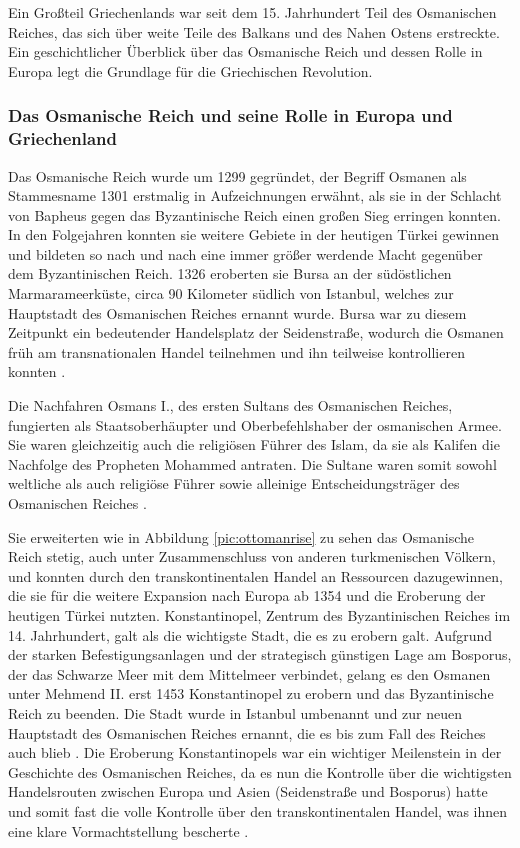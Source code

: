 \documentclass[preprint]{geomorphica} %
\begin{document}
Ein Großteil Griechenlands war seit dem 15. Jahrhundert Teil des Osmanischen Reiches, das sich über weite Teile des Balkans und des Nahen Ostens erstreckte.
Ein geschichtlicher Überblick über das Osmanische Reich und dessen Rolle in Europa legt die Grundlage für die Griechischen Revolution.

\subsubsection{Das Osmanische Reich und seine Rolle in Europa und Griechenland}

Das Osmanische Reich wurde um 1299 gegründet, der Begriff Osmanen als Stammesname 1301 erstmalig in Aufzeichnungen erwähnt, als sie in der Schlacht von Bapheus gegen das Byzantinische Reich einen großen Sieg erringen konnten.
In den Folgejahren konnten sie weitere Gebiete in der heutigen Türkei gewinnen und bildeten so nach und nach eine immer größer werdende Macht gegenüber dem Byzantinischen Reich.
1326 eroberten sie Bursa an der südöstlichen Marmarameerküste, circa 90 Kilometer südlich von Istanbul, welches zur Hauptstadt des Osmanischen Reiches ernannt wurde.
Bursa war zu diesem Zeitpunkt ein bedeutender Handelsplatz der Seidenstraße, wodurch die Osmanen früh am transnationalen Handel teilnehmen und ihn teilweise kontrollieren konnten \cite{Finkel2007, Inalcik1991, Kinross1979}.

Die Nachfahren Osmans I., des ersten Sultans des Osmanischen Reiches, fungierten als Staatsoberhäupter und Oberbefehlshaber der osmanischen Armee.
Sie waren gleichzeitig auch die religiösen Führer des Islam, da sie als Kalifen die Nachfolge des Propheten Mohammed antraten.
Die Sultane waren somit sowohl weltliche als auch religiöse Führer sowie alleinige Entscheidungsträger des Osmanischen Reiches \cite{Finkel2007, Kafadar1995, Lowry2003}.

Sie erweiterten wie in Abbildung \ref{pic:ottomanrise} zu sehen das Osmanische Reich stetig, auch unter Zusammenschluss von anderen turkmenischen Völkern, und konnten durch den transkontinentalen Handel an Ressourcen dazugewinnen, die sie für die weitere Expansion nach Europa ab 1354 und die Eroberung der heutigen Türkei nutzten.
Konstantinopel, Zentrum des Byzantinischen Reiches im 14. Jahrhundert, galt als die wichtigste Stadt, die es zu erobern galt.
Aufgrund der starken Befestigungsanlagen und der strategisch günstigen Lage am Bosporus, der das Schwarze Meer mit dem Mittelmeer verbindet, gelang es den Osmanen unter Mehmend II. erst 1453 Konstantinopel zu erobern und das Byzantinische Reich zu beenden.
Die Stadt wurde in Istanbul umbenannt und zur neuen Hauptstadt des Osmanischen Reiches ernannt, die es bis zum Fall des Reiches auch blieb \cite{Finkel2007, Kinross1979, Brandes2005}.
Die Eroberung Konstantinopels war ein wichtiger Meilenstein in der Geschichte des Osmanischen Reiches, da es nun die Kontrolle über die wichtigsten Handelsrouten zwischen Europa und Asien (Seidenstraße und Bosporus) hatte und somit fast die volle Kontrolle über den transkontinentalen Handel, was ihnen eine klare Vormachtstellung bescherte \cite{Finkel2007, Kafadar1995, Imber2002}.
\end{document}
